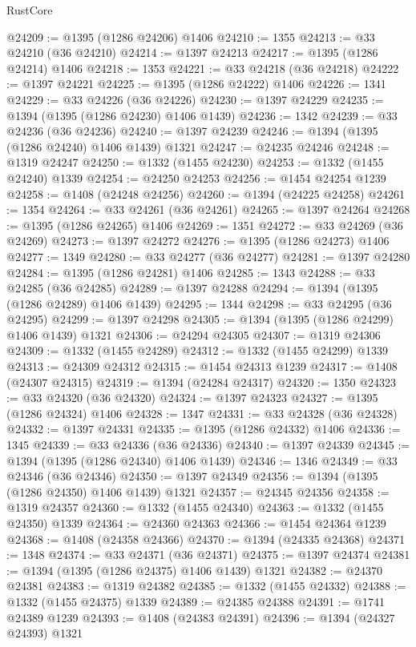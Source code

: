 \begin{lexlean}{RustCore}
\begin{coremodule}
@24209 := @1395 (@1286 @24206) @1406
@24210 := 1355
@24213 := @33 @24210 (@36 @24210)
@24214 := @1397 @24213
@24217 := @1395 (@1286 @24214) @1406
@24218 := 1353
@24221 := @33 @24218 (@36 @24218)
@24222 := @1397 @24221
@24225 := @1395 (@1286 @24222) @1406
@24226 := 1341
@24229 := @33 @24226 (@36 @24226)
@24230 := @1397 @24229
@24235 := @1394 (@1395 (@1286 @24230) @1406 @1439)
@24236 := 1342
@24239 := @33 @24236 (@36 @24236)
@24240 := @1397 @24239
@24246 := @1394 (@1395 (@1286 @24240) @1406 @1439) @1321
@24247 := @24235 @24246
@24248 := @1319 @24247
@24250 := @1332 (@1455 @24230)
@24253 := @1332 (@1455 @24240) @1339
@24254 := @24250 @24253
@24256 := @1454 @24254 @1239
@24258 := @1408 (@24248 @24256)
@24260 := @1394 (@24225 @24258)
@24261 := 1354
@24264 := @33 @24261 (@36 @24261)
@24265 := @1397 @24264
@24268 := @1395 (@1286 @24265) @1406
@24269 := 1351
@24272 := @33 @24269 (@36 @24269)
@24273 := @1397 @24272
@24276 := @1395 (@1286 @24273) @1406
@24277 := 1349
@24280 := @33 @24277 (@36 @24277)
@24281 := @1397 @24280
@24284 := @1395 (@1286 @24281) @1406
@24285 := 1343
@24288 := @33 @24285 (@36 @24285)
@24289 := @1397 @24288
@24294 := @1394 (@1395 (@1286 @24289) @1406 @1439)
@24295 := 1344
@24298 := @33 @24295 (@36 @24295)
@24299 := @1397 @24298
@24305 := @1394 (@1395 (@1286 @24299) @1406 @1439) @1321
@24306 := @24294 @24305
@24307 := @1319 @24306
@24309 := @1332 (@1455 @24289)
@24312 := @1332 (@1455 @24299) @1339
@24313 := @24309 @24312
@24315 := @1454 @24313 @1239
@24317 := @1408 (@24307 @24315)
@24319 := @1394 (@24284 @24317)
@24320 := 1350
@24323 := @33 @24320 (@36 @24320)
@24324 := @1397 @24323
@24327 := @1395 (@1286 @24324) @1406
@24328 := 1347
@24331 := @33 @24328 (@36 @24328)
@24332 := @1397 @24331
@24335 := @1395 (@1286 @24332) @1406
@24336 := 1345
@24339 := @33 @24336 (@36 @24336)
@24340 := @1397 @24339
@24345 := @1394 (@1395 (@1286 @24340) @1406 @1439)
@24346 := 1346
@24349 := @33 @24346 (@36 @24346)
@24350 := @1397 @24349
@24356 := @1394 (@1395 (@1286 @24350) @1406 @1439) @1321
@24357 := @24345 @24356
@24358 := @1319 @24357
@24360 := @1332 (@1455 @24340)
@24363 := @1332 (@1455 @24350) @1339
@24364 := @24360 @24363
@24366 := @1454 @24364 @1239
@24368 := @1408 (@24358 @24366)
@24370 := @1394 (@24335 @24368)
@24371 := 1348
@24374 := @33 @24371 (@36 @24371)
@24375 := @1397 @24374
@24381 := @1394 (@1395 (@1286 @24375) @1406 @1439) @1321
@24382 := @24370 @24381
@24383 := @1319 @24382
@24385 := @1332 (@1455 @24332)
@24388 := @1332 (@1455 @24375) @1339
@24389 := @24385 @24388
@24391 := @1741 @24389 @1239
@24393 := @1408 (@24383 @24391)
@24396 := @1394 (@24327 @24393) @1321

\end{coremodule}
\end{lexlean}
